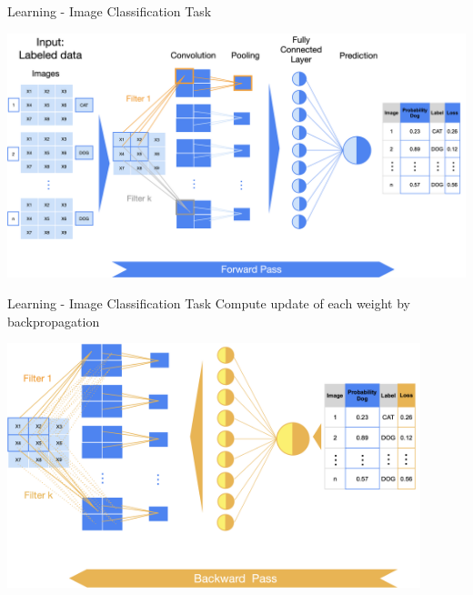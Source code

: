 \documentclass[11pt,compress,t,notes=noshow, xcolor=table]{beamer}
\begin{document}
\begin{vbframe}{Learning - Image Classification Task}
\vspace{0.5cm}
\begin{center}
   \includegraphics[width = \textwidth]{figure_man/nutshell-nn-learning-forwardpass.png}    
\end{center}
 
\end{vbframe}

\begin{vbframe}{Learning - Image Classification Task}
\small Compute update of each weight by backpropagation
\vspace{0.5cm}
\begin{center}
   \includegraphics[width = 0.9\textwidth]{figure_man/nutshell-nn-learning-backpropagation.png}    
\end{center}    
\end{vbframe}
\end{document}
